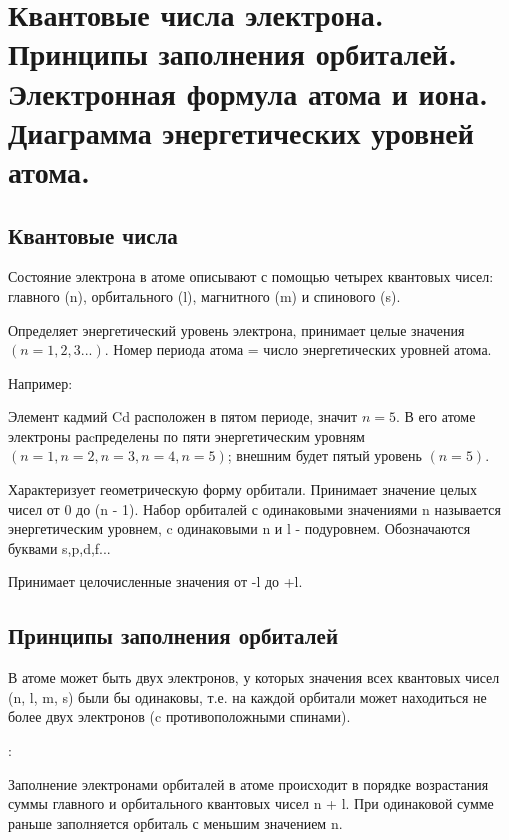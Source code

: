 \section{Квантовые числа электрона. Принципы заполнения орбиталей. Электронная формула атома и иона. Диаграмма энергетических уровней атома.}

\subsection{Квантовые числа}
Состояние электрона в атоме описывают с помощью четырех квантовых чисел: главного (n), орбитального (l), магнитного (m) и спинового (s).

 


Определяет энергетический уровень электрона, принимает целые значения $(n = 1, 2, 3 ...)$. Номер периода атома = число энергетических уровней атома.

Например:

Элемент кадмий Cd расположен в пятом периоде, значит $n = 5$. В его атоме электроны раcпределены по пяти энергетическим уровням $(n = 1, n = 2, n = 3, n = 4, n = 5)$; внешним будет пятый уровень $(n = 5)$. 


 Характеризует геометрическую форму орбитали. Принимает значение целых чисел от 0 до (n - 1). Набор орбиталей с одинаковыми значениями n называется энергетическим уровнем, c одинаковыми n и l - подуровнем. Обозначаются буквами s,p,d,f...
 
 
 Принимает целочисленные значения от -l до +l. 
 
 \subsection{Принципы заполнения орбиталей}
 
 
 В атоме может быть двух электронов, у которых значения всех квантовых чисел (n, l, m, s) были бы одинаковы, т.е. на каждой орбитали может находиться не более двух электронов (c противоположными спинами).
 
 :
 
 Заполнение электронами орбиталей в атоме происходит в порядке возрастания суммы главного и орбитального квантовых чисел n + l. При одинаковой сумме раньше заполняется орбиталь с меньшим значением n.

